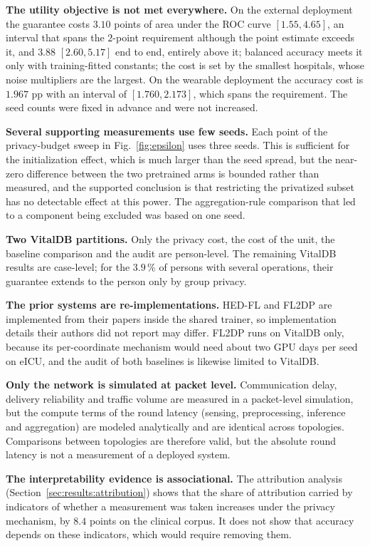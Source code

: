 \textbf{The utility objective is not met everywhere.} On the external
deployment the guarantee costs $3.10$ points of area under the ROC curve
$[1.55, 4.65]$, an interval that spans the $2$-point requirement although the
point estimate exceeds it, and $3.88$ $[2.60, 5.17]$ end to end, entirely
above it; balanced accuracy meets it only with training-fitted constants; the cost is set by the smallest hospitals, whose noise multipliers
are the largest. On the wearable deployment the accuracy cost is $1.967$ pp
with an interval of $[1.760, 2.173]$, which spans the requirement. The seed
counts were fixed in advance and were not increased.

\textbf{Several supporting measurements use few seeds.} Each point of the
privacy-budget sweep in Fig.~\ref{fig:epsilon} uses three seeds. This is
sufficient for the initialization effect, which is much larger than the seed
spread, but the near-zero difference between the two pretrained arms is
bounded rather than measured, and the supported conclusion is that restricting
the privatized subset has no detectable effect at this power. The
aggregation-rule comparison that led to a component being excluded was based
on one seed.

\textbf{Two VitalDB partitions.} Only the privacy cost, the cost of the unit,
the baseline comparison and the audit are person-level. The remaining VitalDB
results are case-level; for the $3.9\,\%$ of persons with
several operations, their guarantee extends to the person only by group
privacy.

\textbf{The prior systems are re-implementations.} HED-FL and FL2DP are
implemented from their papers inside the shared trainer, so implementation
details their authors did not report may differ. FL2DP runs on VitalDB only,
because its per-coordinate mechanism would need about two GPU days per seed on
eICU, and the audit of both baselines is likewise limited to VitalDB.

\textbf{Only the network is simulated at packet level.} Communication delay,
delivery reliability and traffic volume are measured in a packet-level
simulation, but the compute terms of the round latency (sensing,
preprocessing, inference and aggregation) are modeled analytically and are
identical across topologies. Comparisons between topologies are therefore
valid, but the absolute round latency is not a measurement of a deployed
system.

\textbf{The interpretability evidence is associational.} The attribution
analysis (Section~\ref{sec:results:attribution}) shows that the share of
attribution carried by indicators of whether a measurement was taken increases
under the privacy mechanism, by $8.4$ points on the clinical corpus. It does not show that accuracy depends on these indicators, which
would require removing them.

